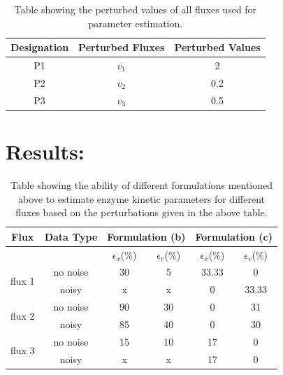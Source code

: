 \documentclass[10pt]{article}
\begin{document}
	\begin{table}[!tbhp]
		\caption{Table showing the perturbed values of all fluxes used for parameter estimation.}
		\begin{center}				
			\begin{tabular}{ccc}
				Designation & Perturbed Fluxes & Perturbed Values\\
				\hline
				P1 & $v_1$ & 2\\
				P2 & $v_2$ & 0.2\\
				P3 & $v_3$ & 0.5
			\end{tabular}
		\end{center}	
		\label{tab:pval}
	\end{table}

	\section{Results:}

	\begin{table}[!tbhp]
		\caption{Table showing the ability of different formulations mentioned above to estimate enzyme kinetic parameters for different fluxes based on the perturbations given in the above table.}
		\begin{center}				
			\begin{tabular}{cccccc}
				\hline
				Flux & Data Type & \multicolumn{2}{c}{Formulation (b)} & \multicolumn{2}{c}{Formulation (c)}\\
				\hline
				&&$\epsilon_x$(\%)&$\epsilon_v$(\%)&$\epsilon_x$(\%)&$\epsilon_v$(\%)\\
				\hline
				\multirow{2}{*}{flux 1} & no noise & 30 & 5 & 33.33 & 0\\
												  &	noisy & x & x & 0 & 33.33\\
			  	\hline
				 \multirow{2}{*}{flux 2} & no noise & 90 & 30 & 0 & 31\\
				 									& noisy & 85 & 40 & 0 & 30\\
				\hline				 									
				\multirow{2}{*}{flux 3} & no noise & 15 & 10 & 17 & 0\\
													& noisy & x & x & 17 & 0\\
				\hline			
			\end{tabular}
		\end{center}	
		\label{tab:res1}
	\end{table}
\end{document}
